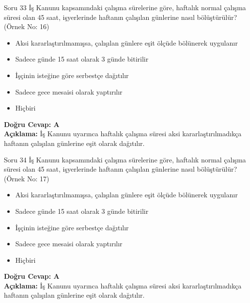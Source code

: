 \documentclass[12pt,a4paper]{article}
\begin{document}
\begin{testcard}{Soru 33}
    İş Kanunu kapsamındaki çalışma sürelerine göre, haftalık normal çalışma süresi olan 45 saat, işyerlerinde haftanın çalışılan günlerine nasıl bölüştürülür? (Örnek No: 16)
    \begin{itemize}
        \item[A)] Aksi kararlaştırılmamışsa, çalışılan günlere eşit ölçüde bölünerek uygulanır
        \item[B)] Sadece günde 15 saat olarak 3 günde bitirilir
        \item[C)] İşçinin isteğine göre serbestçe dağıtılır
        \item[D)] Sadece gece mesaisi olarak yaptırılır
        \item[E)] Hiçbiri
    \end{itemize}
    \tcblower
    \textbf{Doğru Cevap: A} \\
    \textbf{Açıklama:} İş Kanunu uyarınca haftalık çalışma süresi aksi kararlaştırılmadıkça haftanın çalışılan günlerine eşit olarak dağıtılır.
\end{testcard}

\begin{testcard}{Soru 34}
    İş Kanunu kapsamındaki çalışma sürelerine göre, haftalık normal çalışma süresi olan 45 saat, işyerlerinde haftanın çalışılan günlerine nasıl bölüştürülür? (Örnek No: 17)
    \begin{itemize}
        \item[A)] Aksi kararlaştırılmamışsa, çalışılan günlere eşit ölçüde bölünerek uygulanır
        \item[B)] Sadece günde 15 saat olarak 3 günde bitirilir
        \item[C)] İşçinin isteğine göre serbestçe dağıtılır
        \item[D)] Sadece gece mesaisi olarak yaptırılır
        \item[E)] Hiçbiri
    \end{itemize}
    \tcblower
    \textbf{Doğru Cevap: A} \\
    \textbf{Açıklama:} İş Kanunu uyarınca haftalık çalışma süresi aksi kararlaştırılmadıkça haftanın çalışılan günlerine eşit olarak dağıtılır.
\end{testcard}
\end{document}
